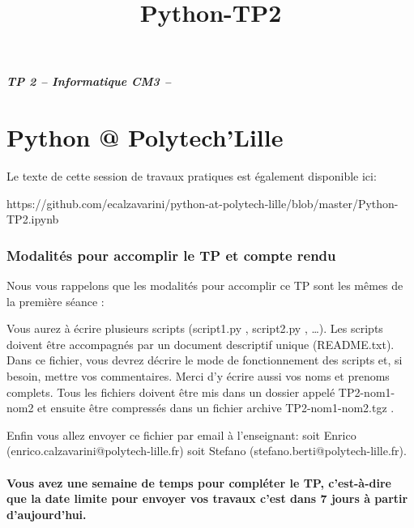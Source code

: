 \documentclass{article}
\title{Python-TP2}
\date{}
\begin{document}
    
    
    \maketitle
    
    

    
    \subparagraph{TP 2 -- Informatique CM3 --}\label{tp-2-informatique-cm3}

    \section{Python @ Polytech'Lille}\label{python-polytechlille}

    Le texte de cette session de travaux pratiques est également disponible
ici:

https://github.com/ecalzavarini/python-at-polytech-lille/blob/master/Python-TP2.ipynb

    \subsubsection{Modalités pour accomplir le TP et compte
rendu}\label{modalituxe9s-pour-accomplir-le-tp-et-compte-rendu}

    Nous vous rappelons que les modalités pour accomplir ce TP sont les
mêmes de la première séance :

    Vous aurez à écrire plusieurs scripts (script1.py , script2.py ,
\ldots{}). Les scripts doivent être accompagnés par un document
descriptif unique (README.txt). Dans ce fichier, vous devrez décrire le
mode de fonctionnement des scripts et, si besoin, mettre vos
commentaires. Merci d'y écrire aussi vos noms et prenoms complets. Tous
les fichiers doivent être mis dans un dossier appelé TP2-nom1-nom2 et
ensuite être compressés dans un fichier archive TP2-nom1-nom2.tgz .

Enfin vous allez envoyer ce fichier par email à l'enseignant: soit
Enrico (enrico.calzavarini@polytech-lille.fr) soit Stefano
(stefano.berti@polytech-lille.fr).

    \paragraph{Vous avez une semaine de temps pour compléter le TP,
c'est-à-dire que la date limite pour envoyer vos travaux c'est dans 7
jours à partir
d'aujourd'hui.}\label{vous-avez-une-semaine-de-temps-pour-compluxe9ter-le-tp-cest-uxe0-dire-que-la-date-limite-pour-envoyer-vos-travaux-cest-dans-7-jours-uxe0-partir-daujourdhui.}
\end{document}
